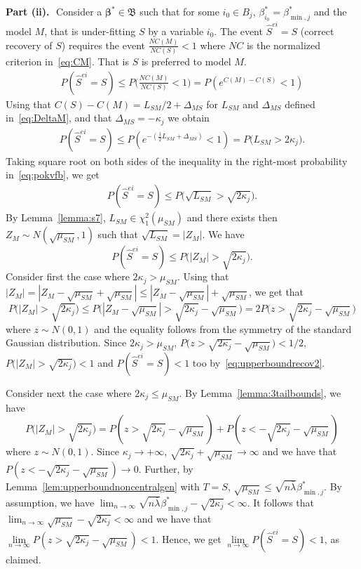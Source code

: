 \documentclass[
  12pt]{article}
\newcommand{\bbeta}{\boldsymbol{\beta}}
\newcommand{\bB}{\mathfrak{B}}
\begin{document}
\textbf{Part (ii).}\,\,
Consider a $\bbeta^*\in \bB$ such that for some $i_{0}\in B_j$, $\beta^*_{i_{0}}=\beta_{\min,j}^*$ and the model $M$, that is under-fitting $S$ by a variable $i_{0}$. The event $\hat{S}^{ei}=S$ (correct recovery of $S$) requires the event $\frac{NC(M)}{NC(S)}<1$ where $NC$ is the normalized criterion in~\eqref{eq:CM}. That is $S$ is preferred to model $M$. 
\begin{align*}
P(\hat{S}^{ei}=S) 
\leq P\Big(\frac{NC(M)}{NC(S)}<1\Big)
= P \left( e^{C(M)-C(S)} <1 \right)
\end{align*}
Using that $C(S)-C(M)=L_{SM}/2 + \Delta_{MS}$ for $L_{SM}$ and $\Delta_{MS}$ defined in~\eqref{eq:DeltaM}, and that $\Delta_{MS}=-\kappa_j$ we obtain
\begin{align}\label{eq:pokvfb}
P(\hat{S}^{ei}=S) 
\leq  P \left(e^{-(\frac{1}{2} L_{SM} + \Delta_{MS})} < 1 \right) =
P\Big(L_{SM}>2\kappa_j\Big).
\end{align}
Taking square root on both sides of the inequality in the right-most probability in~\eqref{eq:pokvfb}, we get
\begin{align}\label{eq:pokvfc}
P(\hat{S}^{ei}=S) 
\leq P\Big(\sqrt{L_{SM}}>\sqrt{2\kappa_j}\Big).
\end{align}
By Lemma~\ref{lemma:s7}, $L_{SM}\in \chi^2_1(\mu_{SM})$ and  there exists then $Z_M\sim N(\sqrt{\mu_{SM}},1)$ such that $\sqrt{L_{SM}}=|Z_M|$. We have
\begin{equation}\label{eq:upperboundrecov2}
    P(\hat{S}^{ei}=S) \leq  P\big(|Z_M|>\sqrt{2\kappa_j}\big).
\end{equation}
Consider first the case where $2\kappa_j>\mu_{SM}$. Using that $|Z_M|=|Z_M-\sqrt{\mu_{SM}}+\sqrt{\mu_{SM}}|\leq  |Z_M-\sqrt{\mu_{SM}}| + \sqrt{\mu_{SM}}$, we get that 
$$P\big(|Z_M|>\sqrt{2\kappa_j}\big)\leq P\big(|Z_M-\sqrt{\mu_{SM}}|>\sqrt{2\kappa_j}-\sqrt{\mu_{SM}}\big) = 2P\big(z>\sqrt{2\kappa_j}-\sqrt{\mu_{SM}}\big)$$
where $z\sim N(0,1)$ and the equality follows from the symmetry of the standard Gaussian distribution. Since $2\kappa_j>\mu_{SM}$, $P\big(z>\sqrt{2\kappa_j}-\sqrt{\mu_{SM}}\big)<1/2$, $P\big(|Z_M|>\sqrt{2\kappa_j}\big)<1$ and $P(\hat{S}^{ei}=S)<1$ too by~\eqref{eq:upperboundrecov2}.

Consider next the case where $2\kappa_j\leq\mu_{SM}$. By Lemma~\ref{lemma:3tailbounds}, we have
$$P\big(|Z_M|>\sqrt{2\kappa_j}\big)
    = P\left(z>\sqrt{2\kappa_j}-\sqrt{\mu_{SM}}\right) + P\left(z<-\sqrt{2\kappa_j}-\sqrt{\mu_{SM}}\right)$$ where $z\sim N(0,1)$. Since $\kappa_j\to+\infty$, $\sqrt{2\kappa_j}+\sqrt{\mu_{SM}}\to\infty$ and we have that $P(z<-\sqrt{2\kappa_j}-\sqrt{\mu_{SM}}) \to 0$.  
    Further, by Lemma~\ref{lem:upperboundnoncentralgen} with $T=S$, $\sqrt{\mu_{SM}}\leq \sqrt{n\bar{\lambda}}\beta_{\min,j}^*$. By assumption, we have $\lim_{n\to \infty}\sqrt{n\bar{\lambda}}\beta_{\min,j}^*-\sqrt{2\kappa_j} < \infty$. It follows that $\lim_{n\to \infty}\sqrt{\mu_{SM}}-\sqrt{2\kappa_j} < \infty$ and we have that $\underset{n \to \infty}{\lim}P\left(z>\sqrt{2\kappa_j}-\sqrt{\mu_{SM}}\right)<1$. Hence, we get $\underset{n \to \infty}{\lim}P\left(\hat{S}^{ei} = S \right)<1$, as claimed.
\end{document}
